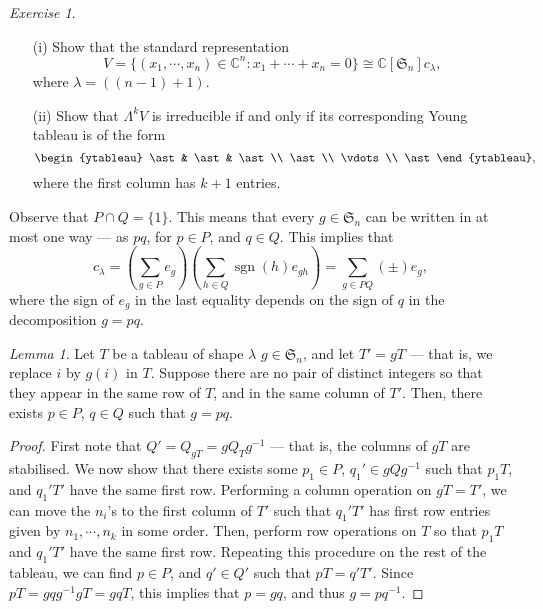 \documentclass[a4paper]{report}
\theoremstyle{definition}
\theoremstyle{remark}
\theoremstyle{proposition}
\theoremstyle{conjecture}
\theoremstyle{lemma}
\newtheorem{lemma}{Lemma}
\theoremstyle{corollary}
\theoremstyle{exercise}
\newtheorem{exercise}{Exercise}
\theoremstyle{example}
\newcommand{\C}{\mathbb{C}}
\newcommand{\on}{\operatorname}
\begin{document}
\begin{exercise}
    \leavevmode
    \begin{itemize}
        \item[(i)] Show that the standard representation
            $$V = \lbrace (x_1,\cdots,x_n)\in\C^n : x_1+\cdots+x_n = 0\rbrace \cong \C[\mathfrak{S}_n]c_\lambda,$$
            where $\lambda = ( (n-1) + 1)$.
        \item[(ii)] Show that $\Lambda^kV$ is irreducible if and only if 
            its corresponding Young tableau is of the form
            $$\begin{ytableau}
                \ast & \ast & \ast\\
                \ast\\
                \vdots\\
                \ast
            \end{ytableau},$$
            where the first column has $k+1$ entries.
    \end{itemize}
\end{exercise}

Observe that $P\cap Q = \lbrace 1 \rbrace$.
This means that every $g\in\mathfrak{S}_n$ can be written in at most
one way --- as $pq$, for $p\in P$, and $q\in Q$. This implies 
that $$c_\lambda = \left(\sum_{g\in P} e_g\right) \left(\sum_{h\in Q}\on{sgn}(h)e_{gh}\right) = \sum_{g \in PQ}(\pm) e_g,$$
where the sign of $e_g$ in the last equality depends on
the sign of $q$ in the decomposition $g=pq$. 

\begin{lemma}\label{lem6}
    Let $T$ be a tableau of shape $\lambda$
    $g \in \mathfrak{S}_n$, and let $T' = gT$ --- that is, we 
    replace $i$ by $g(i)$ in $T$. 
    Suppose there are no 
    pair of distinct integers so that they appear in the same row of $T$,
    and in the same column of $T'$.
    Then, there exists $p\in P$, $q\in Q$ such that $g = pq$.
\end{lemma}

\begin{proof}
    First note that $Q' = Q_{gT} = gQ_Tg^{-1}$ --- that is, 
    the columns of $gT$ are stabilised. We now show that there 
    exists some $p_1 \in P$, $q_1' \in gQg^{-1}$ such that 
    $p_1T$, and $q_1'T'$ have the same first row. Performing a column operation
    on $gT = T'$, we can move the $n_i$'s to the first column of $T'$ such that
    $q_1'T'$ has first row entries given by $n_1,\cdots,n_k$ in some order.
    Then, perform row operations on $T$ so that $p_1T$ and 
    $q_1'T'$ have the same first row. Repeating this procedure on the rest 
    of the tableau, we can find $p\in P$, and $q' \in Q'$ such that 
    $pT  = q'T'$. Since $pT = gqg^{-1}gT = gqT$, this implies that 
    $p = gq$, and thus $g = pq^{-1}$. 

\end{proof}
\end{document}
